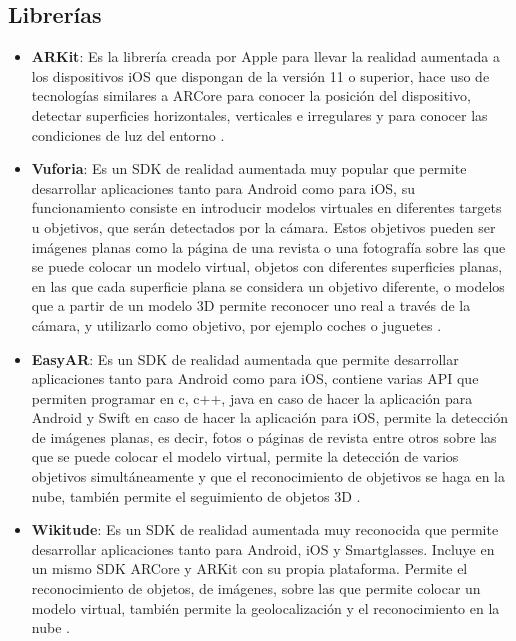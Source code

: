 \subsection{Librerías}
\begin{itemize}
  \item \textbf{ARKit}: Es la librería creada por Apple para llevar la realidad aumentada a los dispositivos iOS que dispongan de la versión 11 o superior, hace uso de tecnologías similares a ARCore para conocer la posición del dispositivo, detectar superficies horizontales, verticales e irregulares y para conocer las condiciones de luz del entorno \cite{arkit}.

  \item \textbf{Vuforia}: Es un SDK de realidad aumentada muy popular que permite desarrollar aplicaciones tanto para Android como para iOS, su funcionamiento consiste en introducir modelos virtuales en diferentes targets u objetivos, que serán detectados por la cámara. Estos objetivos pueden ser imágenes planas como la página de una revista o una fotografía sobre las que se puede colocar un modelo virtual, objetos con diferentes superficies planas, en las que cada superficie plana se considera un objetivo diferente, o modelos que a partir de un modelo 3D permite reconocer uno real a través de la cámara, y utilizarlo como objetivo, por ejemplo coches o juguetes \cite{vuforia}.

  \item \textbf{EasyAR}: Es un SDK de realidad aumentada que permite desarrollar aplicaciones tanto para Android como para iOS, contiene varias API que permiten programar en c, c++, java en caso de hacer la aplicación para Android y Swift en caso de hacer la aplicación para iOS, permite la detección de imágenes planas, es decir, fotos o páginas de revista entre otros sobre las que se puede colocar el modelo virtual, permite la detección de varios objetivos simultáneamente y que el reconocimiento de objetivos se haga en la nube, también permite el seguimiento de objetos 3D \cite{easyar}.

  \item \textbf{Wikitude}: Es un SDK de realidad aumentada muy reconocida que permite desarrollar aplicaciones tanto para Android, iOS y Smartglasses. Incluye en un mismo SDK ARCore y ARKit con su propia plataforma. Permite el reconocimiento de objetos, de imágenes, sobre las que permite colocar un modelo virtual, también permite la geolocalización y el reconocimiento en la nube \cite{wikitude}.
\end{itemize}


